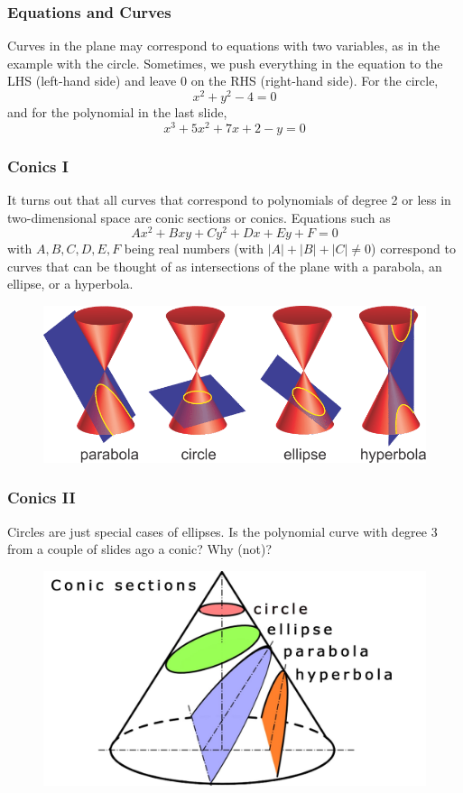 \documentclass[xcolor=dvipsnames]{beamer}
\begin{document}
\begin{frame}
  \frametitle{Equations and Curves}
  Curves in the plane may correspond to equations with two variables,
  as in the example with the circle. Sometimes, we push everything in
  the equation to the LHS (left-hand side) and leave $0$ on the RHS
  (right-hand side). For the circle,
\begin{equation}
  \label{eq:fuazegho}
x^{2}+y^{2}-4=0
\end{equation}
and for the polynomial in the last slide,
\begin{equation}
  \label{eq:iivoixah}
x^{3}+5x^{2}+7x+2-y=0
\end{equation}
\end{frame}

\begin{frame}
  \frametitle{Conics I}
  It turns out that all curves that correspond to polynomials of
  degree 2 or less in two-dimensional space are conic sections or
  \alert{conics}. Equations such as
\begin{equation}
  \label{eq:aipheiyu}
Ax^{2}+Bxy+Cy^{2}+Dx+Ey+F=0
\end{equation}
with $A,B,C,D,E,F$ being real numbers (with $|A|+|B|+|C|\neq{}0$)
correspond to curves that can be thought of as intersections of the
plane with a \alert{parabola}, an \alert{ellipse}, or a
\alert{hyperbola}.
  \begin{figure}[h]
    \includegraphics[scale=.35]{./conics1.png}
  \end{figure}
\end{frame}

\begin{frame}
  \frametitle{Conics II}
Circles are just special cases of ellipses. Is the polynomial curve
with degree 3 from a couple of slides ago a conic? Why (not)?
  \begin{figure}[h]
    \includegraphics[scale=.17]{./conics2.jpg}
  \end{figure}
\end{frame}
\end{document}
